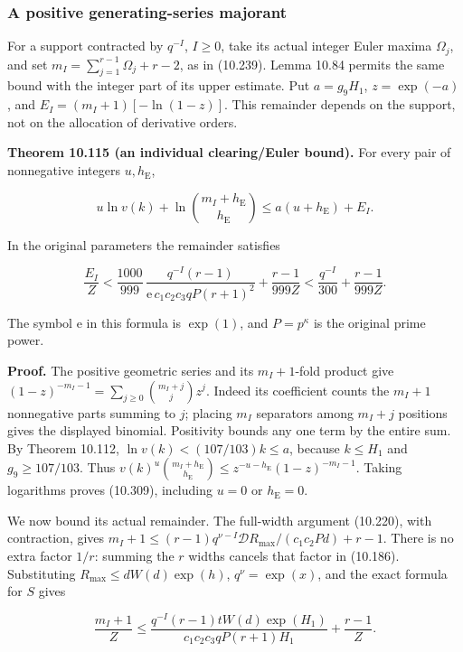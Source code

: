 \documentclass[
  11pt,
  a4paper,
]{article}
\begin{document}
\subsubsection{A positive generating-series
majorant}\label{a-positive-generating-series-majorant}

For a support contracted by \(q^{-I}\), \(I\ge0\), take its actual
integer Euler maxima \(\Omega_j\), and set
\(m_I=\sum_{j=1}^{r-1}\Omega_j+r-2\), as in (10.239). Lemma 10.84
permits the same bound with the integer part of its upper estimate. Put
\(a=g_9H_1\), \(z=\exp(-a)\), and \(E_I=(m_I+1)[-\ln(1-z)]\). This
remainder depends on the support, not on the allocation of derivative
orders.

\textbf{Theorem 10.115 (an individual clearing/Euler bound).} For every
pair of nonnegative integers \(u,h_{\mathrm E}\),

\[
u\ln v(k)+\ln\binom{m_I+h_{\mathrm E}}{h_{\mathrm E}}
\le a(u+h_{\mathrm E})+E_I.
\tag{10.309}
\]

In the original parameters the remainder satisfies

\[
\frac{E_I}{Z}<
\frac{1000}{999}\,
\frac{q^{-I}(r-1)}{\mathrm e\,c_1c_2c_3qP(r+1)^2}
+\frac{r-1}{999Z}
<\frac{q^{-I}}{300}+\frac{r-1}{999Z}.
\tag{10.310}
\]

The symbol \(\mathrm e\) in this formula is \(\exp(1)\), and
\(P=p^\kappa\) is the original prime power.

\textbf{Proof.} The positive geometric series and its \(m_I+1\)-fold
product give \((1-z)^{-m_I-1}=\sum_{j\ge0}\binom{m_I+j}{j}z^j\). Indeed
its coefficient counts the \(m_I+1\) nonnegative parts summing to \(j\);
placing \(m_I\) separators among \(m_I+j\) positions gives the displayed
binomial. Positivity bounds any one term by the entire sum. By Theorem
10.112, \(\ln v(k)<(107/103)k\le a\), because \(k\le H_1\) and
\(g_9\ge107/103\). Thus
\(v(k)^u\binom{m_I+h_{\mathrm E}}{h_{\mathrm E}}\le z^{-u-h_{\mathrm E}}(1-z)^{-m_I-1}\).
Taking logarithms proves (10.309), including \(u=0\) or
\(h_{\mathrm E}=0\).

We now bound its actual remainder. The full-width argument (10.220),
with contraction, gives
\(m_I+1\le(r-1)q^{\nu-I}\mathcal D R_{\max}/(c_1c_2Pd)+r-1\). There is
no extra factor \(1/r\): summing the \(r\) widths cancels that factor in
(10.186). Substituting \(R_{\max}\le dW(d)\exp(h)\), \(q^\nu=\exp(x)\),
and the exact formula for \(S\) gives

\[
\frac{m_I+1}{Z}
\le\frac{q^{-I}(r-1)tW(d)\exp(H_1)}
 {c_1c_2c_3qP(r+1)H_1}
+\frac{r-1}{Z}.
\tag{10.311}
\]
\end{document}
